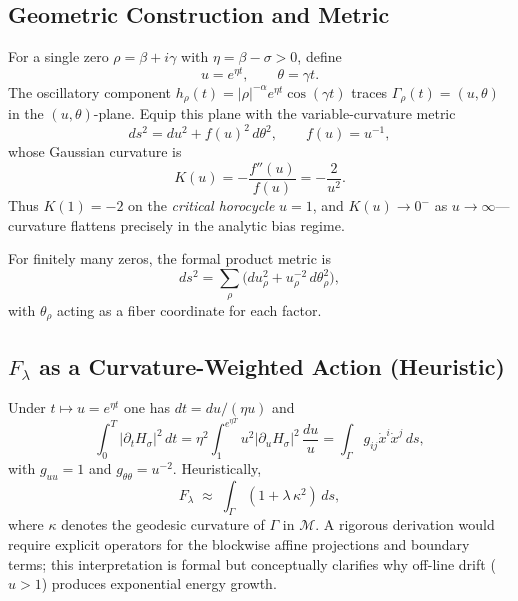 \subsection{Geometric Construction and Metric}

For a single zero $\rho=\beta+i\gamma$ with $\eta=\beta-\sigma>0$, define
\[
u = e^{\eta t}, \qquad \theta = \gamma t .
\]
The oscillatory component
$h_\rho(t)=|\rho|^{-\alpha} e^{\eta t}\cos(\gamma t)$ traces
$\Gamma_\rho(t)=(u,\theta)$ in the $(u,\theta)$-plane.
Equip this plane with the variable-curvature metric
\begin{equation}
ds^2 = du^2 + f(u)^2\, d\theta^2, \qquad f(u)=u^{-1},
\label{eq:metric}
\end{equation}
whose Gaussian curvature is
\begin{equation}
K(u)=-\frac{f''(u)}{f(u)}=-\frac{2}{u^2}.
\label{eq:curvature}
\end{equation}
Thus $K(1)=-2$ on the \emph{critical horocycle} $u=1$, and $K(u)\!\to\!0^-$ as
$u\!\to\!\infty$—curvature flattens precisely in the analytic bias regime.

For finitely many zeros, the formal product metric is
\begin{equation}
ds^2=\sum_\rho \bigl(du_\rho^2 + u_\rho^{-2}\, d\theta_\rho^2\bigr),
\label{eq:product-metric}
\end{equation}
with $\theta_\rho$ acting as a fiber coordinate for each factor.

\subsection{\texorpdfstring{$F_\lambda$}{Fλ} as a Curvature-Weighted Action (Heuristic)}

Under $t\mapsto u=e^{\eta t}$ one has $dt=du/(\eta u)$ and
\[
\int_0^T |\partial_t H_\sigma|^2\,dt
  = \eta^2\!\!\int_{1}^{e^{\eta T}} u^2|\partial_u H_\sigma|^2\,\frac{du}{u}
  = \int_\Gamma g_{ij}\dot{x}^i\dot{x}^j\,ds,
\]
with $g_{uu}=1$ and $g_{\theta\theta}=u^{-2}$.
Heuristically,
\[
F_\lambda \;\approx\; \int_\Gamma (1+\lambda\,\kappa^2)\,ds ,
\]
where $\kappa$ denotes the geodesic curvature of $\Gamma$ in $\mathcal{M}$.
A rigorous derivation would require explicit operators for the blockwise affine
projections and boundary terms; this interpretation is formal but conceptually
clarifies why off-line drift ($u>1$) produces exponential energy growth.

